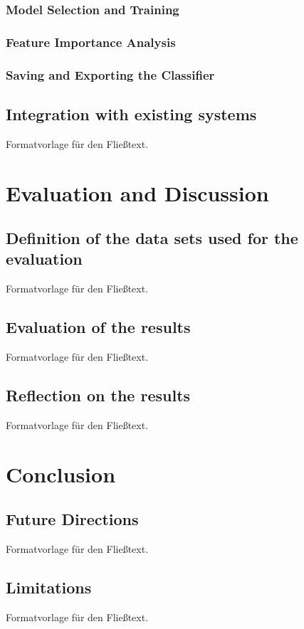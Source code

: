 \documentclass[a4paper,12pt,twoside]{scrreprt}
\begin{document}
\subsection{Model Selection and Training}

\subsection{Feature Importance Analysis}

\subsection{Saving and Exporting the Classifier}

\section{Integration with existing systems}
Formatvorlage für den Fließtext.

\chapter{Evaluation and Discussion}

\section{Definition of the data sets used for the evaluation}
Formatvorlage für den Fließtext.

\section{Evaluation of the results}
Formatvorlage für den Fließtext.

\section{Reflection on the results}
Formatvorlage für den Fließtext.

\chapter{Conclusion}

\section{Future Directions}
Formatvorlage für den Fließtext.

\section{Limitations}
Formatvorlage für den Fließtext.
\end{document}
